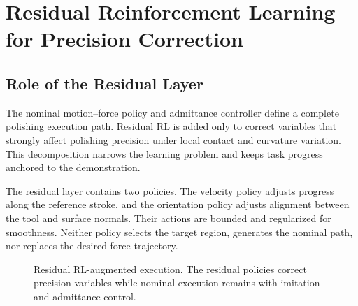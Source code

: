 \chapter{Residual Reinforcement Learning for Precision Correction}
\label{chap:residual_rl}

\section{Role of the Residual Layer}
The nominal motion--force policy and admittance controller define a complete polishing execution path. Residual RL is added only to correct variables that strongly affect polishing precision under local contact and curvature variation. This decomposition narrows the learning problem and keeps task progress anchored to the demonstration.

The residual layer contains two policies. The velocity policy adjusts progress along the reference stroke, and the orientation policy adjusts alignment between the tool and surface normals. Their actions are bounded and regularized for smoothness. Neither policy selects the target region, generates the nominal path, nor replaces the desired force trajectory.

\begin{figure}[t]
  \centering
  \caption{Residual RL-augmented execution. The residual policies correct precision variables while nominal execution remains with imitation and admittance control.}
  \label{fig:residual_execution}
\end{figure}

